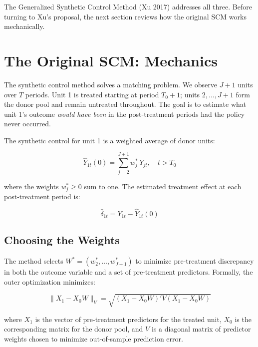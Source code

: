\documentclass[12pt]{article}
\begin{document}
The Generalized Synthetic Control Method (Xu 2017) addresses all three.
Before turning to Xu's proposal, the next section reviews how the original SCM
works mechanically.

\section{The Original SCM: Mechanics}

The synthetic control method solves a matching problem.
We observe $J+1$ units over $T$ periods.
Unit 1 is treated starting at period $T_0 + 1$;
units $2, \ldots, J+1$ form the donor pool and remain untreated throughout.
The goal is to estimate what unit 1's outcome \emph{would have been} in the
post-treatment periods had the policy never occurred.

The synthetic control for unit 1 is a weighted average of donor units:

\begin{equation}
  \hat{Y}_{1t}(0) = \sum_{j=2}^{J+1} w_j^* \, Y_{jt}, \quad t > T_0
\end{equation}

where the weights $w_j^* \geq 0$ sum to one.
The estimated treatment effect at each post-treatment period is:

\begin{equation}
  \hat{\delta}_{1t} = Y_{1t} - \hat{Y}_{1t}(0)
\end{equation}

\subsection{Choosing the Weights}

The method selects $W^* = (w_2^*, \ldots, w_{J+1}^*)$ to minimize pre-treatment
discrepancy in both the outcome variable and a set of pre-treatment predictors.
Formally, the outer optimization minimizes:

\begin{equation}
  \| X_1 - X_0 W \|_V = \sqrt{(X_1 - X_0 W)' V (X_1 - X_0 W)}
\end{equation}

where $X_1$ is the vector of pre-treatment predictors for the treated unit,
$X_0$ is the corresponding matrix for the donor pool,
and $V$ is a diagonal matrix of predictor weights chosen to minimize
out-of-sample prediction error.
\end{document}
